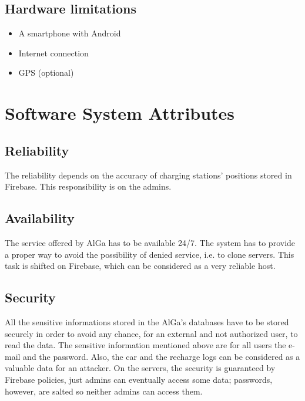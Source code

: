 \subsection{Hardware limitations}
\begin{itemize}
    \item A smartphone with Android
    \item Internet connection
    \item GPS (optional)
\end{itemize}
		
\section{Software System Attributes}
\subsection{Reliability}
The reliability depends on the accuracy of charging stations' positions stored in Firebase. This responsibility is on the admins.

\subsection{Availability}
The service offered by AlGa has to be available 24/7. The system has to provide a proper way to avoid the possibility of denied service, i.e. to clone servers. This task is shifted on Firebase, which can be considered as a very reliable host.

\subsection{Security}
All the sensitive informations stored in the AlGa’s databases have to be stored securely in order to avoid any chance, for an external and not authorized user, to read the data. The sensitive information mentioned above are for all users the e-mail and the password. Also, the car and the recharge logs can be considered as a valuable data for an attacker.
On the servers, the security is guaranteed by Firebase policies, just admins can eventually access some data; passwords, however, are salted so neither admins can access them. 

